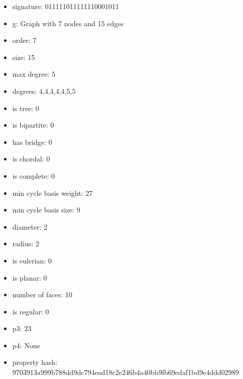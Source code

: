 \begin{figure}
\end{figure}
\begin{itemize}
\item signature: 011111011111110001011
\item g: Graph with 7 nodes and 15 edges
\item order: 7
\item size: 15
\item max degree: 5
\item degrees: 4,4,4,4,4,5,5
\item is tree: 0
\item is bipartite: 0
\item has bridge: 0
\item is chordal: 0
\item is complete: 0
\item min cycle basis weight: 27
\item min cycle basis size: 9
\item diameter: 2
\item radius: 2
\item is eulerian: 0
\item is planar: 0
\item number of faces: 10
\item is regular: 0
\item p3: 23
\item p4: None
\item property hash: 9703913a999b788dd9dc794ead18c2e246b4a40bb9fb69edaf1bd9e4ddd02989
\end{itemize}
\newpage

